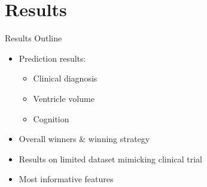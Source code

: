 \documentclass[8pt,xcolor=table,aspectratio=169]{beamer}
\begin{document}
\section{Results}

\begin{frame}{Results Outline}

\begin{itemize}
\item Prediction results:
\begin{itemize}
 \item Clinical diagnosis
  \item Ventricle volume
  \item Cognition
\end{itemize}

\vspace{2em}

\item Overall winners \& winning strategy

\vspace{2em}

% 

\item Results on limited dataset mimicking clinical trial

\vspace{2em}

\item Most informative features

\end{itemize}

\end{frame}


\newcommand{\reducedstrut}{\vrule width 0pt height .9\ht\strutbox depth .9\dp\strutbox\relax}

\newcommand{\colbox}[2]{%
  \begingroup
  \setlength{\fboxsep}{0pt}%
  \colorbox{#1}{\reducedstrut{#2}\/}%
  \endgroup
}
\end{document}
